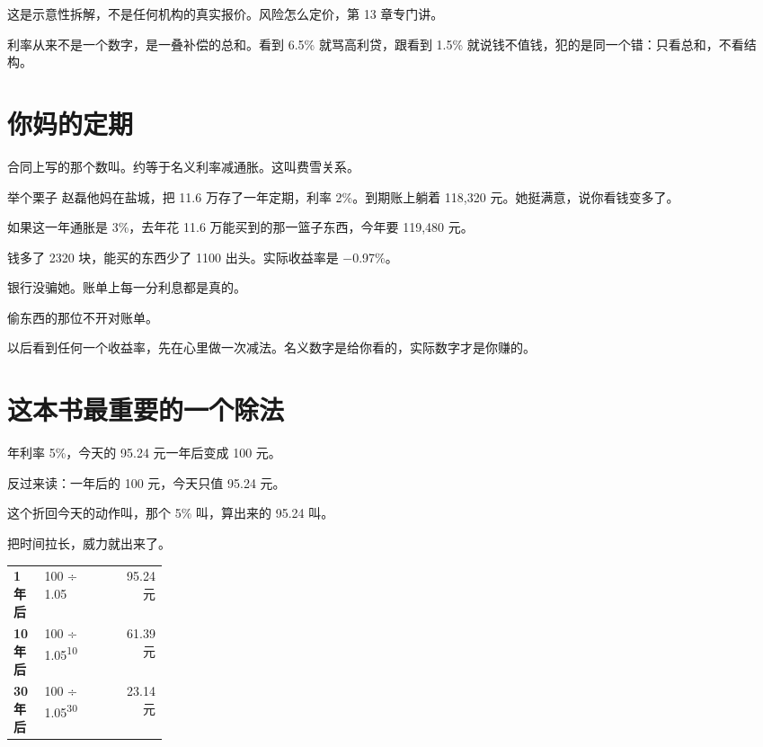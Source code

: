 这是示意性拆解，不是任何机构的真实报价。风险怎么定价，第 13 章专门讲。

利率从来不是一个数字，是一叠补偿的总和。看到 6.5\% 就骂高利贷，跟看到 1.5\% 就说钱不值钱，犯的是同一个错：只看总和，不看结构。

\section{你妈的定期}

合同上写的那个数叫。约等于名义利率减通胀。这叫费雪关系。

\begin{egbox}{举个栗子}
赵磊他妈在盐城，把 11.6 万存了一年定期，利率 2\%。到期账上躺着 118,320 元。她挺满意，说你看钱变多了。

如果这一年通胀是 3\%，去年花 11.6 万能买到的那一篮子东西，今年要 119,480 元。

钱多了 2320 块，能买的东西少了 1100 出头。实际收益率是 −0.97\%。

银行没骗她。账单上每一分利息都是真的。

偷东西的那位不开对账单。

\end{egbox}

以后看到任何一个收益率，先在心里做一次减法。名义数字是给你看的，实际数字才是你赚的。

\section{这本书最重要的一个除法}

年利率 5\%，今天的 95.24 元一年后变成 100 元。

反过来读：一年后的 100 元，今天只值 95.24 元。

这个折回今天的动作叫，那个 5\% 叫，算出来的 95.24 叫。

把时间拉长，威力就出来了。

\begin{tablewrap}
\begin{xltabular}{\linewidth}{>{\raggedright\arraybackslash}p{0.20\linewidth}Xr}
\toprule
{} &  &  \\
\midrule
\textbf{1 年后} & 100 ÷ 1.05 & 95.24 元 \\
\textbf{10 年后} & 100 ÷ 1.05\textsuperscript{10} & 61.39 元 \\
\textbf{30 年后} & 100 ÷ 1.05\textsuperscript{30} & 23.14 元 \\
\bottomrule
\end{xltabular}
\end{tablewrap}

